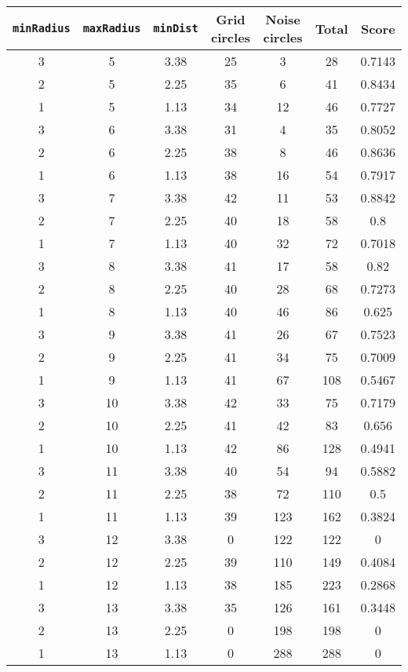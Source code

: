 \documentclass[letterpaper, 12pt]{article}
\begin{document}
\begin{longtable}{|c|c|c|c|c|c|c|}
\hline
\textbf{\texttt{minRadius}} & \textbf{\texttt{maxRadius}} & \textbf{\texttt{minDist}} & \textbf{Grid circles} & \textbf{Noise circles} & \textbf{Total} & \textbf{Score} \\
\hline
3 & 5 & 3.38 & 25 & 3 & 28 & 0.7143 \\
\hline
2 & 5 & 2.25 & 35 & 6 & 41 & 0.8434 \\
\hline
1 & 5 & 1.13 & 34 & 12 & 46 & 0.7727 \\
\hline
3 & 6 & 3.38 & 31 & 4 & 35 & 0.8052 \\
\hline
2 & 6 & 2.25 & 38 & 8 & 46 & 0.8636 \\
\hline
1 & 6 & 1.13 & 38 & 16 & 54 & 0.7917 \\
\hline
3 & 7 & 3.38 & 42 & 11 & 53 & 0.8842 \\
\hline
2 & 7 & 2.25 & 40 & 18 & 58 & 0.8 \\
\hline
1 & 7 & 1.13 & 40 & 32 & 72 & 0.7018 \\
\hline
3 & 8 & 3.38 & 41 & 17 & 58 & 0.82 \\
\hline
2 & 8 & 2.25 & 40 & 28 & 68 & 0.7273 \\
\hline
1 & 8 & 1.13 & 40 & 46 & 86 & 0.625 \\
\hline
3 & 9 & 3.38 & 41 & 26 & 67 & 0.7523 \\
\hline
2 & 9 & 2.25 & 41 & 34 & 75 & 0.7009 \\
\hline
1 & 9 & 1.13 & 41 & 67 & 108 & 0.5467 \\
\hline
3 & 10 & 3.38 & 42 & 33 & 75 & 0.7179 \\
\hline
2 & 10 & 2.25 & 41 & 42 & 83 & 0.656 \\
\hline
1 & 10 & 1.13 & 42 & 86 & 128 & 0.4941 \\
\hline
3 & 11 & 3.38 & 40 & 54 & 94 & 0.5882 \\
\hline
2 & 11 & 2.25 & 38 & 72 & 110 & 0.5 \\
\hline
1 & 11 & 1.13 & 39 & 123 & 162 & 0.3824 \\
\hline
3 & 12 & 3.38 & 0 & 122 & 122 & 0 \\
\hline
2 & 12 & 2.25 & 39 & 110 & 149 & 0.4084 \\
\hline
1 & 12 & 1.13 & 38 & 185 & 223 & 0.2868 \\
\hline
3 & 13 & 3.38 & 35 & 126 & 161 & 0.3448 \\
\hline
2 & 13 & 2.25 & 0 & 198 & 198 & 0 \\
\hline
1 & 13 & 1.13 & 0 & 288 & 288 & 0 \\

\end{longtable}
\end{document}
